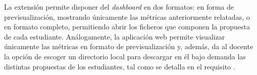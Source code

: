 La extensión permite disponer del \textit{dashboard} en dos formatos: en forma de previsualización, mostrando únicamente las métricas anteriormente relatadas, o en formato completo, permitiendo abrir los ficheros que componen la propuesta de cada estudiante. Análogamente, la aplicación web permite visualizar únicamente las métricas en formato de previsualización y, además, da al docente la opción de escoger un directorio local para descargar en él bajo demanda las distintas propuestas de los estudiantes, tal como se detalla en el requisito .
